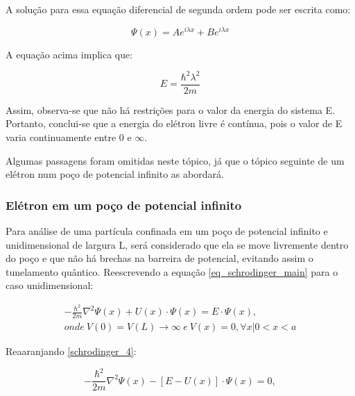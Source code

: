   \par A solução para essa equação diferencial de segunda ordem pode ser escrita como\cite{frustrado7}:

  \begin{equation}
    \label{schrodinger_2}
    \Psi(x) = Ae^{i\lambda x} + Be^{i\lambda x}  
  \end{equation}

  \par A equação acima implica que:

  \begin{equation}
    \label{schrodinger_3}
    E = \frac{\hbar^2 \lambda^2}{2m}
  \end{equation}

  \par Assim, observa-se que não há restrições para o valor da energia do sistema E. Portanto, conclui-se que a energia do elétron livre é contínua, pois o valor de E varia continuamente entre $0$ e $\infty$.

  \par Algumas passagens foram omitidas neste tópico, já que o tópico seguinte de um elétron num poço de potencial infinito as abordará. 

\subsubsection{Elétron em um poço de potencial infinito}

  \par Para análise de uma partícula confinada em um poço de potencial infinito e unidimensional de largura L, será considerado que ela se move livremente dentro do poço e que não há brechas na barreira de potencial, evitando assim o tunelamento quântico. Reescrevendo a equação \eqref{eq_schrodinger_main} para o caso unidimensional: 

  \begin{align}\label{schrodinger_4}
      -\frac{\hbar^2}{2m} \nabla^2 \Psi(x) + U(x) \cdot \Psi(x) = E \cdot \Psi(x),\\
      onde\ V(0)=V(L)\rightarrow \infty\ e\ V(x)=0,\forall x | 0<x<a
  \end{align}

  \par Reaaranjando \eqref{schrodinger_4}:

  \begin{equation}\label{schrodinger_5}
    -\frac{\hbar^2}{2m} \nabla^2 \Psi(x) - [E - U(x)] \cdot \Psi(x) = 0,
  \end{equation}

